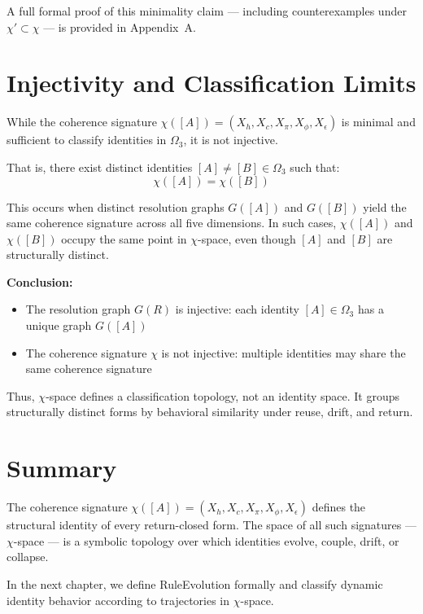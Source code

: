 A full formal proof of this minimality claim — including counterexamples under $\chi' \subset \chi$ — is provided in Appendix~A.

\section{Injectivity and Classification Limits} \label{injectivity-and-classification-limits}

While the coherence signature $\chi([A]) = (X_h, X_c, X_\pi, X_\phi, X_\epsilon)$ is minimal and sufficient to classify identities in $\Omega_3$, it is not injective.

That is, there exist distinct identities $[A] \ne [B] \in \Omega_3$ such that:
\begin{equation} \label{eq:chi-noninjective}
\chi([A]) = \chi([B])
\end{equation}

This occurs when distinct resolution graphs $G([A])$ and $G([B])$ yield the same coherence signature across all five dimensions.  
In such cases, $\chi([A])$ and $\chi([B])$ occupy the same point in $\chi$-space, even though $[A]$ and $[B]$ are structurally distinct.

\textbf{Conclusion:}
\begin{itemize}
  \item The resolution graph $G(R)$ is injective: each identity $[A] \in \Omega_3$ has a unique graph $G([A])$
  \item The coherence signature $\chi$ is not injective: multiple identities may share the same coherence signature
\end{itemize}

Thus, $\chi$-space defines a classification topology, not an identity space.  
It groups structurally distinct forms by behavioral similarity under reuse, drift, and return.

\section{Summary}

The coherence signature $\chi([A]) = (X_h, X_c, X_\pi, X_\phi, X_\epsilon)$ defines the structural identity of every return-closed form.  
The space of all such signatures — $\chi$-space — is a symbolic topology over which identities evolve, couple, drift, or collapse.

In the next chapter, we define RuleEvolution formally and classify dynamic identity behavior according to trajectories in $\chi$-space.
